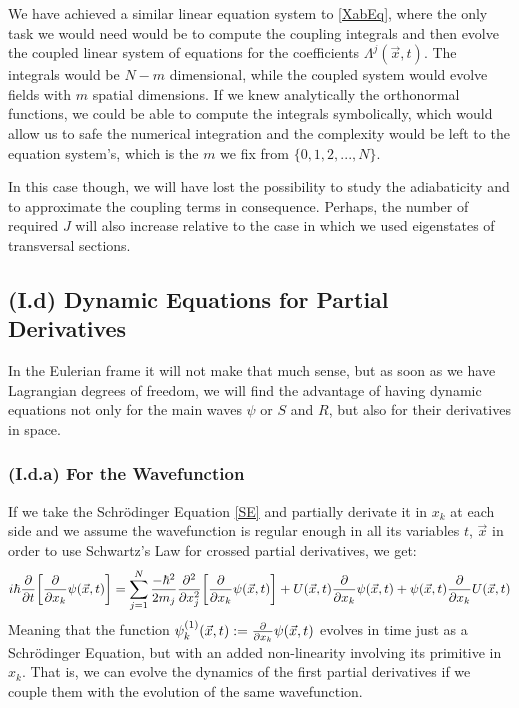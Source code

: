 \documentclass[11pt, a4paper]{article} %
\begin{document}
We have achieved a similar linear equation system to \eqref{XabEq}, where the only task we would need would be to compute the coupling integrals and then evolve the coupled linear system of equations for the coefficients $\Lambda^j(\vec{x},t)$. The integrals would be $N-m$ dimensional, while the coupled system would evolve fields with $m$ spatial dimensions. If we knew analytically the orthonormal functions, we could be able to compute the integrals symbolically, which would allow us to safe the numerical integration and the complexity would be left to the equation system's, which is the $m$ we fix from $\{0,1,2,...,N\}$.

In this case though, we will have lost the possibility to study the adiabaticity and to approximate the coupling terms in consequence. Perhaps, the number of required $J$ will also increase relative to the case in which we used eigenstates of transversal sections.



\subsection*{(I.d) Dynamic Equations for Partial Derivatives}
In the Eulerian frame it will not make that much sense, but as soon as we have Lagrangian degrees of freedom, we will find the advantage of having dynamic equations not only for the main waves $\psi$ or $S$ and $R$, but also for their derivatives in space.\vspace{-0.4cm}

\subsubsection*{(I.d.a) For the Wavefunction}
\vspace{-0.2cm}
If we take the Schrödinger Equation \eqref{SE} and partially derivate it in $x_k$ at each side and we assume the wavefunction is regular enough in all its variables $t$, $\vec{x}$ in order to use Schwartz's Law for crossed partial derivatives, we get:
\begin{equation}
i\hbar \pdv{}{t}\qty[\pdv{}{x_k}\psi(\vec{x},t)] = \sum_{j=1}^N\frac{-\hbar^2}{2m_j}\pdv[2]{}{x_j}\qty[\pdv{}{x_k}\psi(\vec{x},t)]+U(\vec{x},t)\pdv{}{x_k}\psi(\vec{x},t) + \psi(\vec{x},t)\pdv{}{x_k}U(\vec{x},t)
\end{equation}
Meaning that the function $\psi^{(1)}_k(\vec{x},t):=\pdv{}{x_k}\psi(\vec{x},t)$ evolves in time just as a Schrödinger Equation, but with an added non-linearity involving its primitive in $x_k$. That is, we can evolve the dynamics of the first partial derivatives if we couple them with the evolution of the same wavefunction.
\end{document}

